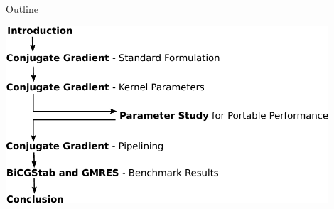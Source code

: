 

%
%

\begin{frame}{Outline}
 \begin{center}
  \includegraphics[width=0.9\textwidth]{figures/outline-crop}
 \end{center}
\end{frame}



%
%


%
%



%
%



%
%



%
%

